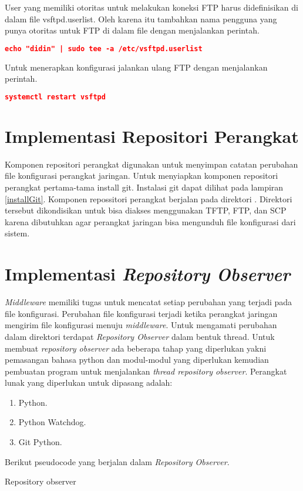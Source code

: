         \indent User yang memiliki otoritas untuk melakukan koneksi FTP harus didefinisikan di dalam file vsftpd.userlist. Oleh karena itu tambahkan nama pengguna yang punya otoritas untuk FTP di dalam file  dengan menjalankan perintah.
    \begin{lstlisting}[frame=single,tabsize=2,breaklines,caption={Pengguna FTP},label=nonrootuser, captionpos=b, language=json,numbers=none]
    echo "didin" | sudo tee -a /etc/vsftpd.userlist
    \end{lstlisting}
        Untuk menerapkan konfigurasi jalankan ulang FTP dengan menjalankan perintah.
    \begin{lstlisting}[frame=single,tabsize=2,breaklines,caption={Jalan ulang FTP},label=nonrootuser, captionpos=b, language=json,numbers=none]
    systemctl restart vsftpd
    \end{lstlisting}
    
    \section{Implementasi Repositori Perangkat}
    Komponen repositori perangkat digunakan untuk menyimpan catatan perubahan file konfigurasi perangkat jaringan. Untuk menyiapkan komponen repositori perangkat pertama-tama install git. Instalasi git dapat dilihat pada lampiran \ref{installGit}. Komponen repossitori perangkat berjalan pada direktori . Direktori tersebut dikondisikan untuk bisa diakses menggunakan TFTP, FTP, dan SCP karena dibutuhkan agar perangkat jaringan bisa mengunduh file konfigurasi dari sistem.
   
   	\section{Implementasi \textit{Repository Observer}}
   		\textit{Middleware} memiliki tugas untuk mencatat setiap perubahan yang terjadi pada file konfigurasi. Perubahan file konfigurasi terjadi ketika perangkat jaringan mengirim file konfigurasi menuju \textit{middleware}. Untuk mengamati perubahan dalam direktori terdapat \textit{Repository Observer} dalam bentuk thread. Untuk membuat \textit{repository observer} ada beberapa tahap yang diperlukan yakni pemasangan bahasa python dan modul-modul yang diperlukan kemudian pembuatan program untuk menjalankan \textit{thread repository observer}. Perangkat lunak yang diperlukan untuk dipasang adalah:
   			\begin{enumerate}
   				\item Python.
   				\item Python Watchdog.
   				\item Git Python.
   			\end{enumerate}	
   		  Berikut pseudocode yang berjalan dalam \textit{Repository Observer}.
   		\begin{algorithm}[H]
   			\caption{Repository observer}
   		\end{algorithm}
